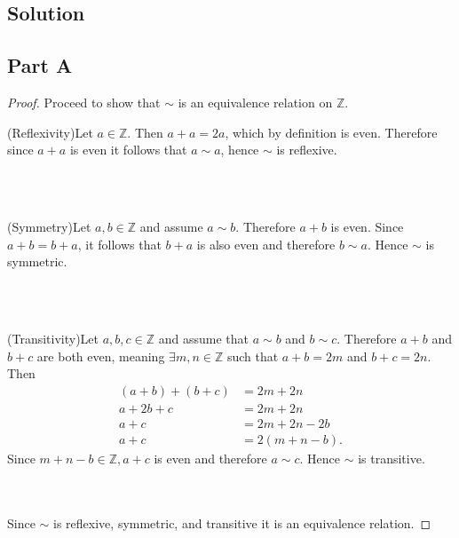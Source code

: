 \documentclass[12pt]{extarticle}
\begin{document}
\subsection*{Solution}
\subsection*{Part A}

\begin{proof}
	Proceed to show that $\sim$ is an equivalence relation on $\mathbb{Z}$. \\

	\qquad\begin{minipage}{\dimexpr\textwidth-2cm}
		(Reflexivity)\quad Let $a \in \mathbb{Z}$. Then $a + a = 2a$, which by definition is even. Therefore since $a + a$ is even it follows that $a \sim a$, hence $\sim$ is reflexive.
	\end{minipage} \\ \\

	\qquad\begin{minipage}{\dimexpr\textwidth-2cm}
		(Symmetry)\quad Let $a,b \in \mathbb{Z}$ and assume $a \sim b$. Therefore $a + b$ is even. Since $a + b = b + a$, it follows that $b+a$ is also even and therefore $b \sim a$. Hence $\sim$ is symmetric. 
	\end{minipage} \\ \\

	\qquad\begin{minipage}{\dimexpr\textwidth-2cm}
		(Transitivity)\quad Let $a,b,c \in \mathbb{Z}$ and assume that $a \sim b$ and $b \sim c$. Therefore $a + b$ and $b + c$ are both even, meaning $\exists m,n \in \mathbb{Z}$ such that $a + b = 2m$ and $b + c = 2n$. Then
		\begin{align*}
			(a + b) + (b + c) &= 2m + 2n \\
			a + 2b + c &= 2m + 2n \\
			a + c &= 2m + 2n - 2b \\
			a + c &= 2(m + n - b)
		.\end{align*}
		Since $m + n - b \in \mathbb{Z}, a + c$ is even and therefore $a \sim c$. Hence $\sim$ is transitive.
	\end{minipage} \\ \\

	Since $\sim$ is reflexive, symmetric, and transitive it is an equivalence relation.
\end{proof}
\end{document}
